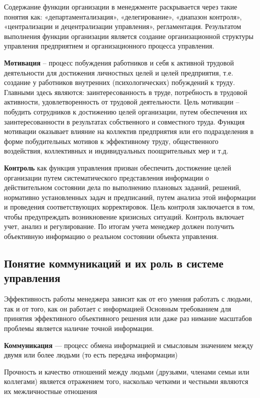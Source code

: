 \documentclass[a4paper,12pt,oneside,final]{extarticle}
\numberwithin{equation}{section}
\begin{document}
Содержание функции организации в менеджменте раскрывается через такие понятия как: «департаментализация», «делегирование», «диапазон контроля», «централизации и децентрализации управления», регламентация. 
Результатом выполнения функции организации является создание организационной структуры управления предприятием и организационного процесса управления.

\textbf{Мотивация} – процесс побуждения работников и себя к активной трудовой деятельности для достижения личностных целей и целей предприятия, т.е. создание у работников внутренних (психологических) побуждений к труду. 
Главными здесь являются: заинтересованность в труде, потребность в трудовой активности, удовлетворенность от трудовой деятельности.
Цель мотивации – побудить сотрудников к достижению целей организации, путем обеспечения их заинтересованности в результатах собственного и совместного труда.
Функция мотивации оказывает влияние на коллектив предприятия или его подразделения в форме побудительных мотивов к эффективному труду, общественного воздействия, коллективных и индивидуальных поощрительных мер и т.д. 

\textbf{Контроль} как функция управления призван обеспечить достижение целей организации путем систематического представления информации о действительном состоянии дела по выполнению плановых заданий, решений, нормативно установленных задач и предписаний, путем анализа этой информации и проведения соответствующих корректировок. 
Цель контроля заключается в том, чтобы предупреждать возникновение кризисных ситуаций. 
Контроль включает учет, анализ и регулирование. 
По итогам учета менеджер должен получить объективную информацию о реальном состоянии объекта управления.

\subsection{Понятие коммуникаций и их роль в системе управления}
Эффективность работы менеджера зависит как от его умения работать с людьми, так и от того, как он работает с информацией Основным требованием для принятия эффективного объективного решения или даже раз нимание масштабов проблемы является наличие точной информации.

\textbf{Коммуникация} --- процесс обмена информацией и смысловым значением между двумя или более людьми (то есть передача информации)

Прочность и качество отношений между людьми (друзьями, членами семьи или коллегами) является отражением того, насколько четкими и честными являются их межличностные отношения
\end{document}
